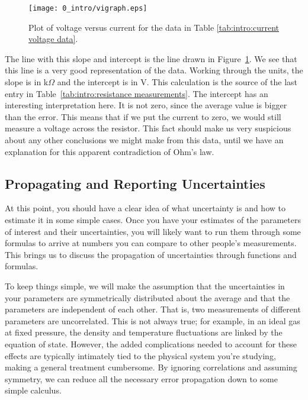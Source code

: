 \begin{figure}[!htb]
 \texttt{[image: 0\_intro/vigraph.eps]}
\caption{Plot of voltage versus current for the data in Table 
\ref{tab:intro:current voltage data}.}
\label{fig:intro:current voltage plot}
\end{figure}

\noindent The line with this slope and intercept is the line drawn in 
Figure~\ref{fig:intro:current voltage plot}. We see that this line is a very 
good representation of the data. Working through the units,  the slope is in 
k$\Omega$ and the intercept is in V. This calculation is the source of the last
entry in Table~\ref{tab:intro:resistance measurements}. The intercept has an 
interesting interpretation here. It is not zero, since the average value is 
bigger than the error. This means that if we put the current to zero, we would 
still measure a voltage across the resistor. This fact should make us very 
suspicious about any other conclusions we might make from this data, until we 
have an explanation for this apparent contradiction of Ohm's law.

\subsection{Propagating and Reporting Uncertainties}
\label{sec:intro:reprtun}
At this point, you should have a clear idea of what uncertainty is and how to 
estimate it in some simple cases. Once you have your estimates of the
parameters of interest and their uncertainties, you will likely want to run
them through some formulas to arrive at numbers you can compare to other
people's measurements. This brings us to discuss the propagation of
uncertainties through functions and formulas.

To keep things simple, we will make the assumption that the uncertainties in
your parameters are symmetrically distributed about the average and that the
parameters are independent of each other. That is, two measurements of
different parameters are uncorrelated. This is not always true; for example,
in an ideal gas at fixed pressure, the density and temperature fluctuations
are linked by the equation of state. However, the added complications needed
to account for these effects are typically intimately tied to the physical
system you're studying, making a general treatment cumbersome. By ignoring
correlations and assuming symmetry, we can reduce all the necessary error
propagation down to some simple calculus.

